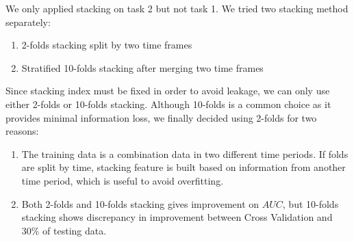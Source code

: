 \documentclass[a4paper]{llncs}
\begin{document}
%
%
%
%
%
%
%
%
%
%
%



We only applied stacking on task 2 but not task 1.
We tried two stacking method separately:
\begin{enumerate}
 \item 2-folds stacking split by two time frames

 \item Stratified 10-folds stacking after merging two time frames
\end{enumerate}

Since stacking index must be fixed in order to avoid leakage, we can only use either 2-folds or 10-folds stacking.
Although 10-folds is a common choice as it provides minimal information loss, we finally decided using 2-folds for two reasons:
\begin{enumerate}
 \item The training data is a combination data in two different time periods. If folds are split by time,
  stacking feature is built based on information from another time period, which is useful to avoid overfitting.

 \item Both 2-folds and 10-folds stacking gives improvement on $AUC$, but 10-folds stacking shows
  discrepancy in improvement between Cross Validation and 30\% of testing data.
\end{enumerate}
\end{document}
